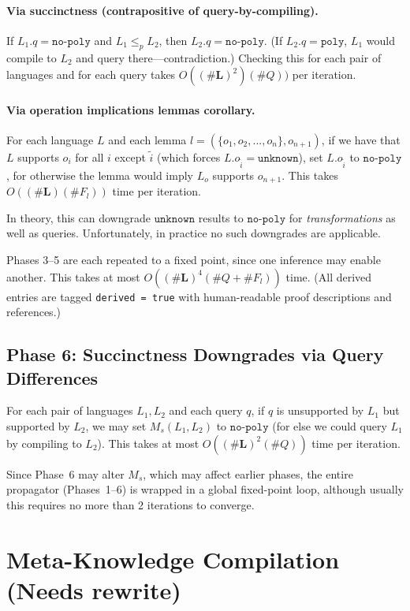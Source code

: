 \documentclass[10pt]{article}
\theoremstyle{plain}
\theoremstyle{definition}
\theoremstyle{remark}
\begin{document}
\paragraph{Via succinctness (contrapositive of query-by-compiling).}
If $L_1.q = \texttt{no-poly}$ and $L_1 \leq_p L_2$, then $L_2.q = \texttt{no-poly}$. (If $L_2.q = \texttt{poly}$, $L_1$ would compile to $L_2$ and query there---contradiction.) Checking this for each pair of languages and for each query takes $O((\#\textbf{L})^2)(\#Q))$ per iteration.

\paragraph{Via operation implications lemmas corollary.}
For each language $L$ and each lemma $l=(\{o_1,o_2,...,o_n\},o_{n+1})$, if we have that $L$ supports $o_i$ for all $i$ except $\tilde i$ (which forces $L.o_{\tilde i}=\texttt{unknown}$), set $L.o_{\tilde i}$ to $\texttt{no-poly}$, for otherwise the lemma would imply $L_o$ supports $o_{n+1}$. This takes $O((\#\textbf{L})(\#F_l))$ time per iteration.

In theory, this can downgrade $\texttt{unknown}$ results to $\texttt{no-poly}$ for \emph{transformations} as well as queries. Unfortunately, in practice no such downgrades are applicable.

Phases 3--5 are each repeated to a fixed point, since one inference may enable another. This takes at most $O((\#\textbf{L})^4(\#Q + \#F_l))$ time. (All derived entries are tagged \texttt{derived = true} with human-readable proof descriptions and references.)

\subsection{Phase 6: Succinctness Downgrades via Query Differences}

For each pair of languages $L_1, L_2$ and each query $q$, if $q$ is unsupported by $L_1$ but supported by $L_2$, we may set $M_s(L_1,L_2)$ to $\texttt{no-poly}$ (for else we could query $L_1$ by compiling to $L_2$). This takes at most $O((\#\textbf{L})^2(\#Q))$ time per iteration.

Since Phase~6 may alter $M_s$, which may affect earlier phases, the entire propagator (Phases~1--6) is wrapped in a global fixed-point loop, although usually this requires no more than 2 iterations to converge.

\section{Meta-Knowledge Compilation (Needs rewrite)}
\end{document}
